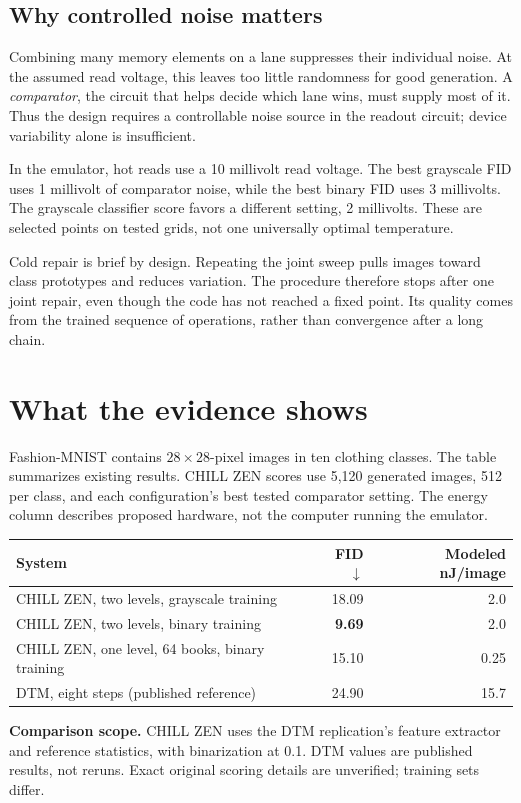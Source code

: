 \documentclass[11pt,letterpaper]{article}
\begin{document}
\subsection{Why controlled noise matters}
Combining many memory elements on a lane suppresses their individual noise. At the assumed read voltage, this leaves too little randomness for good generation. A \emph{comparator}, the circuit that helps decide which lane wins, must supply most of it. Thus the design requires a controllable noise source in the readout circuit; device variability alone is insufficient.

In the emulator, hot reads use a 10 millivolt read voltage. The best grayscale FID uses 1 millivolt of comparator noise, while the best binary FID uses 3 millivolts. The grayscale classifier score favors a different setting, 2 millivolts. These are selected points on tested grids, not one universally optimal temperature.

Cold repair is brief by design. Repeating the joint sweep pulls images toward class prototypes and reduces variation. The procedure therefore stops after one joint repair, even though the code has not reached a fixed point. Its quality comes from the trained sequence of operations, rather than convergence after a long chain.

\newpage
\section{What the evidence shows}
Fashion-MNIST contains $28\times28$-pixel images in ten clothing classes. The table summarizes existing results. CHILL ZEN scores use 5,120 generated images, 512 per class, and each configuration's best tested comparator setting. The energy column describes proposed hardware, not the computer running the emulator.

\begin{center}
\small
\begin{tabularx}{\linewidth}{@{}Xrr@{}}
\toprule
System & FID $\downarrow$ & Modeled nJ/image \\
\midrule
CHILL ZEN, two levels, grayscale training & 18.09 & 2.0 \\
CHILL ZEN, two levels, binary training & \textbf{9.69} & 2.0 \\
CHILL ZEN, one level, 64 books, binary training & 15.10 & 0.25 \\
DTM, eight steps (published reference) & 24.90 & 15.7 \\
\bottomrule
\end{tabularx}
\end{center}
\vspace{-5pt}
{\small\textbf{Comparison scope.} CHILL ZEN uses the DTM replication's feature extractor and reference statistics, with binarization at 0.1. DTM values are published results, not reruns. Exact original scoring details are unverified; training sets differ.}
\end{document}

